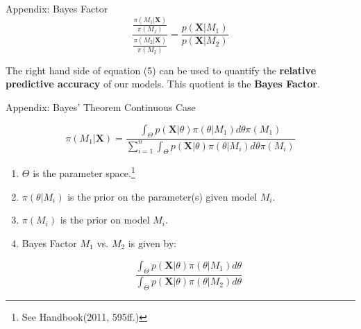 \documentclass{beamer}
\begin{document}
\begin{frame}{Appendix: Bayes Factor}
\begin{equation}
\frac{\frac{\pi(M_{1} | \boldsymbol{X})}{\pi(M_{1})}}{\frac{\pi(M_{2} | \boldsymbol{X})}{\pi(M_{2})}} = \boxed{\frac{p(\boldsymbol{X} | M_{1})}{p(\boldsymbol{X} | M_{2})}}
\end{equation}

The right hand side of equation (5) can be used to quantify the \textbf{relative predictive accuracy} of our models. This quotient is the \textbf{Bayes Factor}.
    \end{frame}
    
\begin{frame}{Appendix: Bayes' Theorem Continuous Case}

\[
\pi(M_{1}| \boldsymbol{X}) = \frac{\int_{\Theta}p(\boldsymbol{X} | \theta)\pi(\theta | M_{1})d\theta \pi(M_{1})}{\sum_{i = 1}^{n}\int_{\Theta}p(\boldsymbol{X} | \theta)\pi(\theta | M_{i})d\theta \pi(M_{i})}
\]
\vfill
\begin{enumerate}
\item $\Theta$ is the parameter space.\footnote{See Handbook(2011, 595ff.)
}
\item $\pi(\theta | M_{i})$ is the prior on the parameter(s) given model $M_{i}$.
\item $\pi(M_{i})$ is the prior on model $M_{i}$.
\item Bayes Factor $M_{1}$ vs. $M_{2}$ is given by:

\[
\frac{\int_{\Theta}p(\boldsymbol{X}| \theta)\pi(\theta | M_{1})d\theta}{\int_{\Theta}p(\boldsymbol{X} | \theta)\pi(\theta | M_{2})d\theta}
\]

\end{enumerate}

\end{frame}
\end{document}
